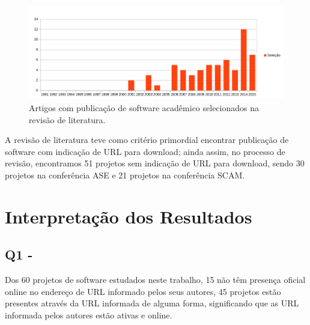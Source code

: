 \begin{figure}[h]
  \center
  \includegraphics[scale=0.65]{imagens/artigos-com-software-por-ano.png}
  \caption{Artigos com publicação de software acadêmico selecionados na revisão de literatura.}
  \label{artigos-com-software-por-ano}
\end{figure}

A revisão de literatura teve como critério primordial encontrar publicação de
software com indicação de URL para download; ainda assim, no processo de
revisão, encontramos 51 projetos sem indicação de URL para download, sendo 30 projetos
na conferência ASE e 21 projetos na conferência SCAM.




\section{Interpretação dos Resultados} \label{estudo1:interpretacao} %

\subsection{Q1 - \EstudoUmQuestaoUm} %

Dos 60 projetos de software estudados neste trabalho, 15 não têm presença
oficial online no endereço de URL informado pelos seus autores, 45 projetos
estão presentes através da URL informada de alguma forma, significando que as
URL informada pelos autores estão ativas e online.

